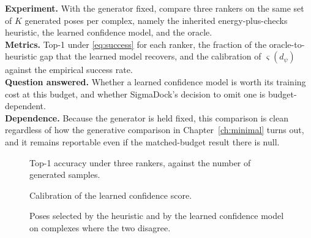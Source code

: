 \documentclass[11pt,a4paper]{report}
\theoremstyle{plain}
\theoremstyle{definition}
\theoremstyle{remark}
\newif\ifdraftmode
\newenvironment{reserved}[1]{%
    \begin{tcolorbox}[
      enhanced, breakable,
      colback=PanelGrey, colframe=DraftBlue,
      boxrule=0.5pt, left=6pt,right=6pt,top=5pt,bottom=5pt,
      fonttitle=\bfseries\small\sffamily,
      title={RESERVED \textendash\ #1}]
      \small\sffamily
  }{%
    \end{tcolorbox}
  }
\newenvironment{reserved}[1]{\setbox0=\vbox\bgroup}{\egroup}
\newcommand{\figplaceholder}[3]{%
  \begin{figure}[htbp]
  \centering
  \ifdraftmode
    \begin{tcolorbox}[
      width=0.92\textwidth, colback=PanelGrey, colframe=DraftGrey,
      boxrule=0.5pt, sharp corners, halign=flush left]
      \small\sffamily
      \textbf{\color{DraftBlue}FIGURE PLACEHOLDER}\\[3pt]
      #3
    \end{tcolorbox}
  \else
    \fbox{\parbox{0.9\textwidth}{\centering\vspace{2cm}[figure]\vspace{2cm}}}
  \fi
  \caption{#2}
  \label{#1}
  \end{figure}}
\begin{document}
\begin{reserved}{Learned ranking against the inherited heuristic}
\textbf{Experiment.} With the generator fixed, compare three rankers on the
same set of $K$ generated poses per complex, namely the inherited
energy-plus-checks heuristic, the learned confidence model, and the oracle.\\
\textbf{Metrics.} Top-1 under \eqref{eq:success} for each ranker, the fraction
of the oracle-to-heuristic gap that the learned model recovers, and the
calibration of $\varsigma(d_\psi)$ against the empirical success rate.\\
\textbf{Question answered.} Whether a learned confidence model is worth its
training cost at this budget, and whether SigmaDock's decision to omit one is
budget-dependent.\\
\textbf{Dependence.} Because the generator is held fixed, this comparison is
clean regardless of how the generative comparison in
Chapter~\ref{ch:minimal} turns out, and it remains reportable even if the
matched-budget result there is null.
\end{reserved}

\figplaceholder{fig:confidence-ranking}
{Top-1 accuracy under three rankers, against the number of generated samples.}
{Three lines against $K$, namely the inherited heuristic, the learned
confidence model, and the oracle, all on the same generated pose sets so that
the generator is held fixed. Shade the region recovered by the learned model as
a fraction of the region between heuristic and oracle, since that fraction is
the headline quantity of the chapter.}

\figplaceholder{fig:confidence-calibration}
{Calibration of the learned confidence score.}
{A reliability diagram with predicted confidence on the $x$ axis, binned, and
the empirical fraction of poses satisfying \eqref{eq:success} on the $y$ axis,
with the diagonal drawn. Include a histogram of predicted confidences beneath,
since calibration in a sparsely populated bin is not informative. Report the
positive rate of the training labels in the caption, because the imbalance
noted above determines how this figure should be read.}

\figplaceholder{fig:confidence-pymol}
{Poses selected by the heuristic and by the learned confidence model on
complexes where the two disagree.}
{Paired panels for a handful of complexes on which the two rankers select
different poses. Show the crystallographic pose, the heuristic's choice and the
confidence model's choice in three distinguishable colours, with the RMSD of
each annotated. Choose examples in both directions, that is, cases where the
learned model wins and cases where it loses, rather than only favourable ones.}
\end{document}
